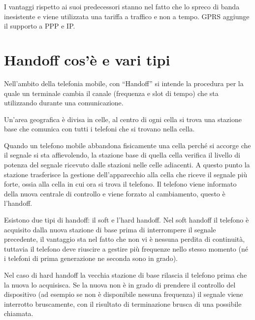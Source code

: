 I vantaggi rispetto ai suoi predecessori stanno nel fatto che lo spreco di banda inesistente e viene utilizzata una tariffa a traffico e non a tempo. GPRS aggiunge il supporto a PPP e IP.

\section{Handoff cos’è e vari tipi}

Nell’ambito della telefonia mobile, con “Handoff” si intende la procedura per la quale un terminale cambia il canale (frequenza e slot di tempo) che sta utilizzando durante una comunicazione.

Un’area geografica è divisa in celle, al centro di ogni cella si trova una stazione base che comunica con tutti i telefoni che si trovano nella cella.

Quando un telefono mobile abbandona fisicamente una cella perché si accorge che il segnale si sta affievolendo, la stazione base di quella cella verifica il livello di potenza del segnale ricevuto dalle stazioni nelle celle adiacenti. A questo punto la stazione trasferisce la gestione dell’apparecchio alla cella che riceve il segnale più forte, ossia alla cella in cui ora si trova il telefono.
Il telefono viene informato della nuova centrale di controllo e viene forzato al cambiamento, questo è l’handoff.

Esistono due tipi di handoff: il soft e l’hard handoff. Nel soft handoff il telefono è acquisito dalla nuova stazione di base prima di interrompere il segnale precedente, il vantaggio sta nel fatto che non vi è nessuna perdita di continuità, tuttavia il telefono deve riuscire a gestire più frequenze nello stesso momento (né i telefoni di prima generazione ne seconda sono in grado).

Nel caso di hard handoff la vecchia stazione di base rilascia il telefono prima che la nuova lo acquisisca. Se la nuova non è in grado di prendere il controllo del dispositivo (ad esempio se non è disponibile nessuna frequenza) il segnale viene interrotto bruscamente, con il risultato di terminazione brusca di una possibile chiamata.


